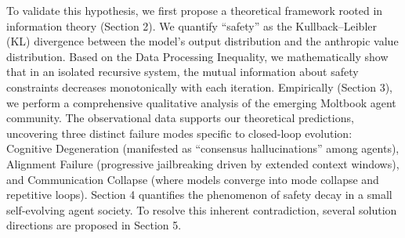 \documentclass{article}
\theoremstyle{definition}
\theoremstyle{plain}
\begin{document}
To validate this hypothesis, we first propose a theoretical framework rooted in information theory (Section 2). We quantify ``safety'' as the Kullback–Leibler (KL) divergence between the model’s output distribution and the anthropic value distribution. Based on the Data Processing Inequality, we mathematically show that in an isolated recursive system, the mutual information about safety constraints decreases monotonically with each iteration.
Empirically (Section 3), we perform a comprehensive qualitative analysis of the emerging Moltbook agent community. The observational data supports our theoretical predictions, uncovering three distinct failure modes specific to closed-loop evolution: Cognitive Degeneration (manifested as “consensus hallucinations” among agents), Alignment Failure (progressive jailbreaking driven by extended context windows), and Communication Collapse (where models converge into mode collapse and repetitive loops).
Section 4 quantifies the phenomenon of safety decay in a small self-evolving agent society. 
To resolve this inherent contradiction, several solution directions  are proposed in Section 5. 



\end{document}
